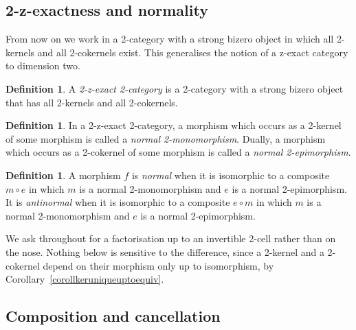 \documentclass[reqno,a4paper]{amsart}
\numberwithin{equation}{section}
\theoremstyle{plain}
\theoremstyle{definition}
\newtheorem{definition}[subsection]{Definition}
\def\nameit#1{\textrm{#1}~}
\def\corx{\nameit{Corollary}}
\def\dfn#1{{\itshape #1}}
\newcommand{\comp}{\circ}
\renewcommand{\1}{\onecat{1}}
\begin{document}
\subsection{2-z-exactness and normality}\label{SS:ZExact}

From now on we work in a 2-category with a strong bizero object in which all 2-kernels and all 2-cokernels exist. This generalises the notion of a z-exact category to dimension two.

\begin{definition}\label{Def ZExact}
	A \dfn{2-z-exact 2-category} is a 2-category with a strong bizero object that has all 2-kernels and all 2-cokernels.
\end{definition}

\begin{definition}\label{Def Normal Mono}
	In a 2-z-exact 2-category, a morphism which occurs as a 2-kernel of some morphism is called a \dfn{normal 2-monomorphism}. Dually, a morphism which occurs as a 2-cokernel of some morphism is called a \dfn{normal 2-epimorphism}.
\end{definition}

\begin{definition}\label{Def Normal}
	A morphism \(f\) is \dfn{normal} when it is isomorphic to a composite \(m\comp e\) in which \(m\) is a normal 2-monomorphism and \(e\) is a normal 2-epimorphism. It is \dfn{antinormal} when it is isomorphic to a composite \(e\comp m\) in which \(m\) is a normal 2-monomorphism and \(e\) is a normal 2-epimorphism.
\end{definition}

We ask throughout for a factorisation up to an invertible 2-cell rather than on the nose. Nothing below is sensitive to the difference, since a 2-kernel and a 2-cokernel depend on their morphism only up to isomorphism, by \corx\ref{corollkeruniqueuptoequiv}.

\subsection{Composition and cancellation}\label{SS:Normal}
\end{document}
